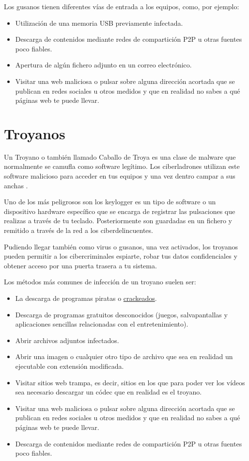 \documentclass[
  spanish,
  a4paper,
  openany]{book}
\begin{document}
Los gusanos tienen diferentes vías de entrada a los equipos, como, por ejemplo:

\begin{itemize}
\item
  Utilización de una memoria USB previamente infectada.
\item
  Descarga de contenidos mediante redes de compartición P2P u otras fuentes poco fiables.
\item
  Apertura de algún fichero adjunto en un correo electrónico.
\item
  Visitar una web maliciosa o pulsar sobre alguna dirección acortada que se publican en redes sociales u otros medidos y que en realidad no sabes a qué páginas web te puede llevar.
\end{itemize}

\hypertarget{troyanos}{%
\section{Troyanos}\label{troyanos}}

Un Troyano o también llamado Caballo de Troya es una clase de malware que normalmente se camufla como software legítimo. Los ciberladrones utilizan este software malicioso para acceder en tus equipos y una vez dentro campar a sus anchas \citep{KASPER-troyano}.

Uno de los más peligrosos son los keylogger es un tipo de software o un dispositivo hardware específico que se encarga de registrar las pulsaciones que realizas a través de tu teclado. Posteriormente son guardadas en un fichero y remitido a través de la red a los ciberdelincuentes.

Pudiendo llegar también como virus o gusanos, una vez activados, los troyanos pueden permitir a los cibercriminales espiarte, robar tus datos confidenciales y obtener acceso por una puerta trasera a tu sistema.

Los métodos más comunes de infección de un troyano suelen ser:

\begin{itemize}
\item
  La descarga de programas piratas o \href{https://es.wikipedia.org/wiki/Cracking_(software)}{crackeados}.
\item
  Descarga de programas gratuitos desconocidos (juegos, salvapantallas y aplicaciones sencillas relacionadas con el entretenimiento).
\item
  Abrir archivos adjuntos infectados.
\item
  Abrir una imagen o cualquier otro tipo de archivo que sea en realidad un ejecutable con extensión modificada.
\item
  Visitar sitios web trampa, es decir, sitios en los que para poder ver los vídeos sea necesario descargar un códec que en realidad es el troyano.
\item
  Visitar una web maliciosa o pulsar sobre alguna dirección acortada que se publican en redes sociales u otros medidos y que en realidad no sabes a qué páginas web te puede llevar.
\item
  Descarga de contenidos mediante redes de compartición P2P u otras fuentes poco fiables.
\end{itemize}
\end{document}
